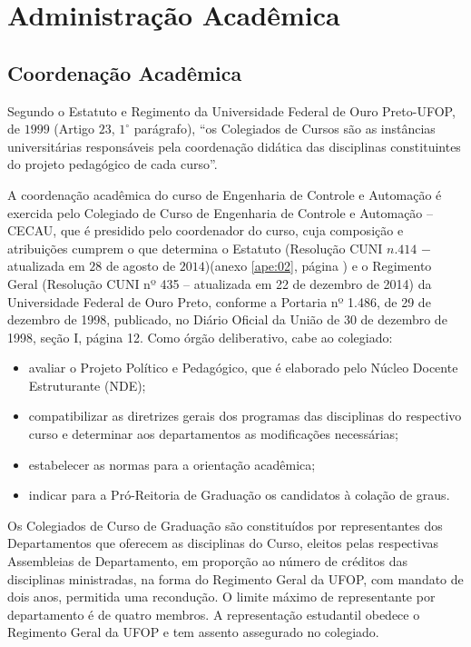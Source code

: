 \chapter{Administra{\c c}{\~a}o Acad{{\^e}mica}}
\label{cap:03} 

\section{Coordenação Acadêmica}
Segundo o Estatuto e Regimento da Universidade Federal de Ouro Preto-UFOP, de $1999$ (Artigo $23$, $ 1^{\circ}$  parágrafo), ``os Colegiados de Cursos são as instâncias universitárias responsáveis pela coordenação didática das disciplinas constituintes do projeto pedagógico de cada curso''.

A coordenação acadêmica do curso de Engenharia de Controle e Automação é exercida pelo Colegiado de Curso de Engenharia de Controle e Automação – CECAU, que é presidido pelo coordenador do curso, cuja composição e atribuições cumprem o que determina o Estatuto (Resolução CUNI $n. 414$ $-$ atualizada em $28$ de agosto de $2014$)(anexo \ref{ape:02}, página \pageref{cuni414}) e o Regimento Geral (Resolução CUNI nº 435 – atualizada em 22 de dezembro de 2014) da Universidade Federal de Ouro Preto, conforme a Portaria nº 1.486, de 29 de dezembro de 1998, publicado, no Diário Oficial da União de 30 de dezembro de 1998, seção I, página 12. Como órgão deliberativo, cabe ao colegiado:

\begin{itemize}
	\item avaliar o Projeto Político e Pedagógico, que é elaborado pelo Núcleo Docente Estruturante (NDE);
	\item compatibilizar as diretrizes gerais dos programas das disciplinas do respectivo curso e determinar aos departamentos as modificações necessárias;
	\item estabelecer as normas para a orientação acadêmica; 
	\item indicar para a Pró-Reitoria de Graduação os candidatos à colação de graus. 
\end{itemize}

Os Colegiados de Curso de Graduação são constituídos por representantes dos Departamentos que oferecem as disciplinas do Curso, eleitos pelas respectivas Assembleias de Departamento, em proporção ao número de créditos das disciplinas ministradas, na forma do Regimento Geral da UFOP, com mandato de dois anos, permitida uma recondução. O limite máximo de representante por departamento é de quatro membros. A representação estudantil obedece o Regimento Geral da UFOP e tem assento assegurado no colegiado.


